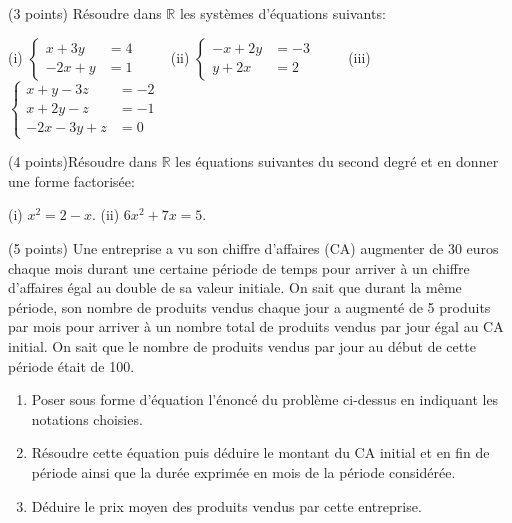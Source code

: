 \documentclass[a4paper, 11pt]{article}
\begin{document}
\exost (3 points) R\'esoudre dans $\mathbb{R}$ les syst\`emes d'\'equations suivants:
  \begin{center}
   (i) $\begin{cases}x+ 3y &= 4\\
              -2x+ y &= 1 \end{cases}\quad\quad$%
   (ii) $\begin{cases}      -x + 2y &= -3 \\
                             y + 2x &= 2\end{cases}\quad\quad$%
   (iii) $ \begin{cases}    x  + y- 3z&= -2 \\
                            x  + 2y- z&= -1 \\
                           -2x - 3y+ z&= 0\end{cases}$
  \end{center} %

  \exost (4 points)R\'esoudre dans $\mathbb{R}$ les \'equations suivantes du second degr\'e et en donner une forme factoris\'ee:
  \begin{center}
    (i) $x^2 = 2 -x$. \quad\quad (ii) $6x^2+ 7x= 5$. %
  \end{center}
  
  
  \exost (5 points) Une entreprise a vu son chiffre d'affaires (CA) augmenter de 30 euros chaque mois durant une certaine p\'eriode de temps %
  pour arriver \`a un chiffre d'affaires \'egal au double de sa valeur initiale. On sait que durant la m\^eme p\'eriode, son nombre
  de produits vendus chaque jour a augment\'e de 5 produits par mois pour arriver \`a un nombre total de produits vendus par jour \'egal au CA initial.
  On sait que le nombre de produits vendus par jour au d\'ebut de cette p\'eriode \'etait de 100.
  
  \begin{enumerate}
   \item Poser sous forme d'\'equation l'\'enonc\'e du probl\`eme ci-dessus en indiquant les notations choisies.
   \item R\'esoudre cette \'equation puis d\'eduire le montant du CA initial et en fin de p\'eriode ainsi que la dur\'ee exprim\'ee en mois de la p\'eriode consid\'er\'ee.
   \item D\'eduire le prix moyen des produits vendus par cette entreprise.
  \end{enumerate}

  
\end{document}
